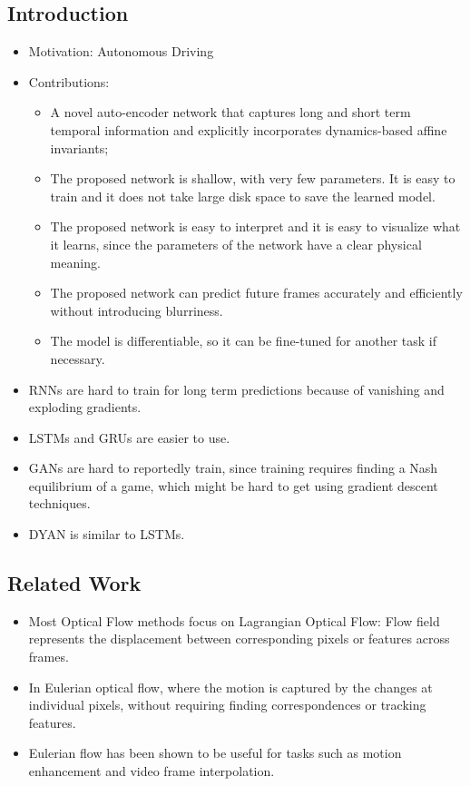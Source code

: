 \documentclass{article}
\begin{document}
    \subsection{Introduction}\label{subsec:DYAN_A_Dynamical_Atoms_Based_Network_For_Video_Prediction:introduction}
    \begin{itemize}
        \item Motivation: Autonomous Driving
        \item Contributions:
        \begin{itemize}
            \item A novel auto-encoder network that captures long and short term temporal information and explicitly incorporates dynamics-based affine invariants;
            \item The proposed network is shallow, with very few parameters.
            It is easy to train and it does not take large disk space to save the learned model.
            \item The proposed network is easy to interpret and it is easy to visualize what it learns, since the parameters of the network have a clear physical meaning.
            \item The proposed network can predict future frames accurately and efficiently without introducing blurriness.
            \item The model is differentiable, so it can be fine-tuned for another task if necessary.
        \end{itemize}
        \item RNNs are hard to train for long term predictions because of vanishing and exploding gradients.
        \item LSTMs and GRUs are easier to use.
        \item GANs are hard to reportedly train, since training requires finding a Nash equilibrium of a game, which might be hard to get using gradient descent techniques.
        \item DYAN is similar to LSTMs.
    \end{itemize}

    \subsection{Related Work}\label{subsec:DYAN_A_Dynamical_Atoms_Based_Network_For_Video_Prediction:related-work}
    \begin{itemize}
        \item Most Optical Flow methods focus on Lagrangian Optical Flow: Flow field represents the displacement between corresponding pixels or features across frames.
        \item In Eulerian optical flow, where the motion is captured by the changes at individual pixels, without requiring finding correspondences or tracking features.
        \item Eulerian flow has been shown to be useful for tasks such as motion enhancement and video frame interpolation.
    \end{itemize}
\end{document}
